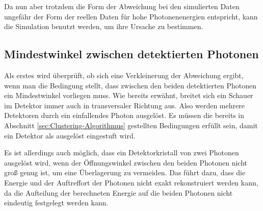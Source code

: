 \documentclass[a4paper,11pt,oneside,final,german,openbib,pdftex]{scrbook}
\begin{document}
{%

Da nun aber trotzdem die Form der Abweichung bei den simulierten Daten ungefähr der Form der reellen Daten für hohe Photonenenergien entspricht, kann die Simulation benutzt werden, um ihre Ursache zu bestimmen.


\subsection{Mindestwinkel zwischen detektierten Photonen}
\label{sec:Min-Openingangle}

Als erstes wird \"uberpr\"uft, ob sich eine Verkleinerung der Abweichung ergibt, wenn man die Bedingung stellt, dass zwischen den beiden detektierten Photonen ein Mindestwinkel vorliegen muss. 
Wie bereits erw\"ahnt, breitet sich ein Schauer im Detektor immer auch in transversaler Richtung aus. Also werden mehrere Detektoren durch ein einfallendes Photon ausgel\"ost. 
Es m\"ussen die bereits in Abschnitt \ref{sec:Clustering-Algorithmus} gestellten Bedingungen erf\"ullt sein, damit ein Detektor als ausgel\"ost eingestuft wird.

Es ist allerdings auch m\"oglich, dass ein Detektorkristall von zwei Photonen ausgel\"ost wird, wenn der \"Offnungswinkel zwischen den beiden Photonen nicht gro{\ss} genug ist, um eine \"Uberlagerung zu vermeiden. Das f\"uhrt dazu, dass die Energie und der Auftreffort der Photonen nicht exakt rekonstruiert werden kann, da die Aufteilung der berechneten Energie auf die beiden Photonen nicht eindeutig festgelegt werden kann.

}
\end{document}
